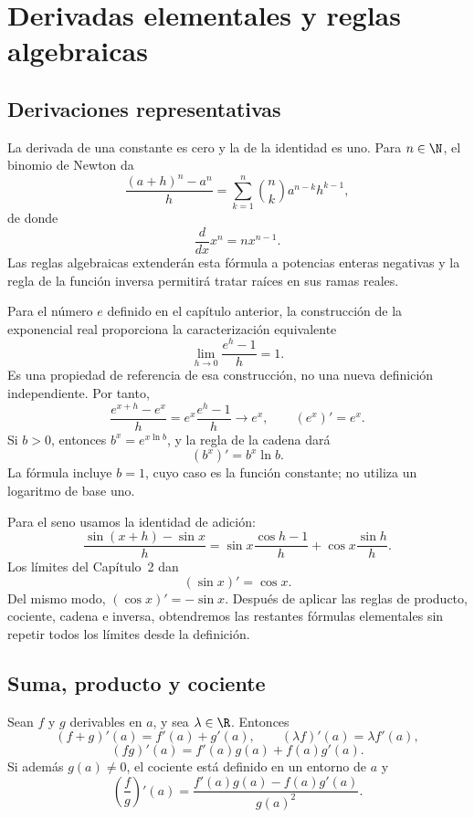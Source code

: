 \section{Derivadas elementales y reglas algebraicas}
\label{sec:reglas-derivacion}

\subsection{Derivaciones representativas}

La derivada de una constante es cero y la de la identidad es uno. Para
\(n\in\N\), el binomio de Newton da
\[
 \frac{(a+h)^n-a^n}{h}
 =\sum_{k=1}^{n}\binom nk a^{n-k}h^{k-1},
\]
de donde
\[
  \frac{d}{dx}x^n=nx^{n-1}.
\]
Las reglas algebraicas extenderán esta fórmula a potencias enteras negativas y
la regla de la función inversa permitirá tratar raíces en sus ramas reales.

Para el número \(e\) definido en el capítulo anterior, la construcción de la
exponencial real proporciona la caracterización equivalente
\[
  \lim_{h\to0}\frac{e^h-1}{h}=1.
\]
Es una propiedad de referencia de esa construcción, no una nueva definición
independiente. Por tanto,
\[
 \frac{e^{x+h}-e^x}{h}
 =e^x\frac{e^h-1}{h}\longrightarrow e^x,
 \qquad
 (e^x)'=e^x.
\]
Si \(b>0\), entonces \(b^x=e^{x\ln b}\), y la regla de la cadena dará
\[
  (b^x)'=b^x\ln b.
\]
La fórmula incluye \(b=1\), cuyo caso es la función constante; no utiliza un
logaritmo de base uno.

Para el seno usamos la identidad de adición:
\[
 \frac{\sin(x+h)-\sin x}{h}
 =\sin x\frac{\cos h-1}{h}
  +\cos x\frac{\sin h}{h}.
\]
Los límites del Capítulo~2 dan
\[
  (\sin x)'=\cos x.
\]
Del mismo modo, \((\cos x)'=-\sin x\). Después de aplicar las reglas de
producto, cociente, cadena e inversa, obtendremos las restantes fórmulas
elementales sin repetir todos los límites desde la definición.

\subsection{Suma, producto y cociente}

\begin{teorema}
Sean \(f\) y \(g\) derivables en \(a\), y sea \(\lambda\in\R\). Entonces
\[
 (f+g)'(a)=f'(a)+g'(a),
 \qquad
 (\lambda f)'(a)=\lambda f'(a),
\]
\[
 (fg)'(a)=f'(a)g(a)+f(a)g'(a).
\]
Si además \(g(a)\ne0\), el cociente está definido en un entorno de \(a\) y
\[
 \left(\frac f g\right)'(a)
 =\frac{f'(a)g(a)-f(a)g'(a)}{g(a)^2}.
\]
\end{teorema}

